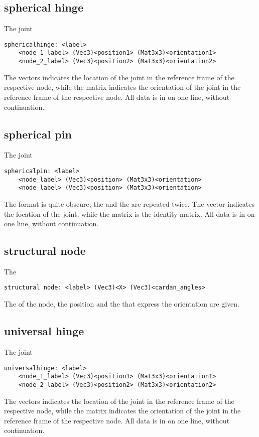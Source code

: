 \subsection{spherical hinge}
The  joint
\begin{verbatim}
sphericalhinge: <label>
    <node_1_label> (Vec3)<position1> (Mat3x3)<orientation1>
    <node_2_label> (Vec3)<position2> (Mat3x3)<orientation2>
\end{verbatim}
The  vectors indicates the location of the joint
in the reference frame of the respective node,
while the matrix  indicates the orientation of the joint
in the reference frame of the respective node.
All data is in on one line, without continuation.

\subsection{spherical pin}
The  joint
\begin{verbatim}
sphericalpin: <label>
    <node_label> (Vec3)<position> (Mat3x3)<orientation>
    <node_label> (Vec3)<position> (Mat3x3)<orientation>
\end{verbatim}
The format is quite obscure; the  and the 
are repeated twice.
The vector  indicates the location of the joint,
while the matrix  is the identity matrix.
All data is in on one line, without continuation.

\subsection{structural node}
The 
\begin{verbatim}
structural node: <label> (Vec3)<X> (Vec3)<cardan_angles>
\end{verbatim}
The  of the node, the position 
and the  that express the orientation
are given.

\subsection{universal hinge}
The  joint
\begin{verbatim}
universalhinge: <label>
    <node_1_label> (Vec3)<position1> (Mat3x3)<orientation1>
    <node_2_label> (Vec3)<position2> (Mat3x3)<orientation2>
\end{verbatim}
The  vectors indicates the location of the joint
in the reference frame of the respective node,
while the matrix  indicates the orientation of the joint
in the reference frame of the respective node.
All data is in on one line, without continuation.

